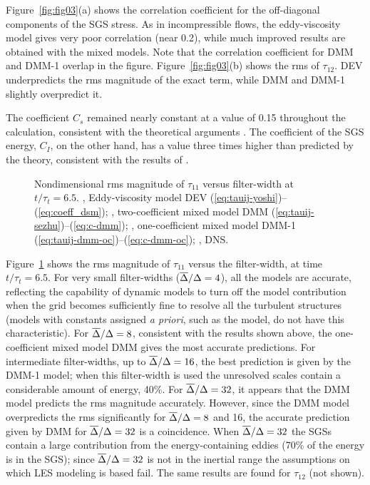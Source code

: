\documentclass[tcfd]{svjour}
\begin{document}
Figure~\ref{fig:fig03}(a) shows the correlation coeff\/icient for the off-diagonal
components of the SGS stress. As in incompressible f\/lows, the
eddy-viscosity model gives very poor correlation (near 0.2), while much
improved results are obtained with the mixed models. Note that the
correlation coeff\/icient for DMM and DMM-1 overlap in the f\/igure.
Figure~\ref{fig:fig03}(b) shows the rms of $\tau_{12}$. DEV underpredicts the rms
magnitude of the exact term, while DMM and DMM-1 slightly overpredict it.

The coeff\/icient $C_s$ remained nearly constant at a value of 0.15
throughout the calculation, consistent with the theoretical arguments
\citep{yos86}. The coeff\/icient of the SGS energy, $C_I$, on the
other hand, has a value three times higher than predicted by the
theory, consistent with the results of \citet{moi91}.

\begin{figure}[t]
\vspace{46mm}%
\caption{Nondimensional rms magnitude of $\tau_{11}$ versus
f\/ilter-width at $t/\tau_t=6.5$. \solid, Eddy-viscosity model DEV
(\protect\ref{eq:tauij-yoshi})--(\protect\ref{eq:coeff_dsm}); \dashed, two-coeff\/icient mixed
model DMM (\protect\ref{eq:tauij-sezhu})--(\protect\ref{eq:c-dmm}); \chndot, one-coeff\/icient
mixed model DMM-1 (\protect\ref{eq:tauij-dmm-oc})--(\protect\ref{eq:c-dmm-oc}); \trian,
DNS.}
\label{fig:fig04}
\end{figure}

Figure~\ref{fig:fig04} shows the rms magnitude of $\tau_{11}$ versus the
f\/ilter-width, at time $t/\tau_t=6.5$. For very small f\/ilter-widths
($\overline{\Delta}/\Delta=4$), all the models are accurate, ref\/lecting the
capability of dynamic models to turn off the model contribution when
the grid becomes suff\/iciently f\/ine to resolve all the turbulent
structures (models with constants assigned {\it a priori}, such as
the \citet{sma63} model, do not have this characteristic). For
$\overline{\Delta}/\Delta=8$, consistent with the results shown above, the
one-coeff\/icient mixed model DMM gives the most accurate predictions.
For intermediate f\/ilter-widths, up to $\overline{\Delta}/\Delta=16$, the best
prediction is given by the DMM-1 model; when this f\/ilter-width is used
the unresolved scales contain a considerable amount of energy, 40\%.
For $\overline{\Delta}/\Delta=32$, it appears that the DMM model predicts the
rms magnitude accurately. However, since the DMM model overpredicts
the rms signif\/icantly for $\overline{\Delta}/\Delta=8$ and 16, the accurate
prediction given by DMM for $\overline{\Delta}/\Delta=32$ is a coincidence.
When $\overline{\Delta}/\Delta=32$ the SGSs contain a large contribution
from the energy-containing eddies (70\% of the energy is in the SGS);
since $\overline{\Delta}/\Delta=32$ is not in the inertial range the
assumptions on which LES modeling is based fail. The same results are found
for $\tau_{12}$ (not shown).
\end{document}

